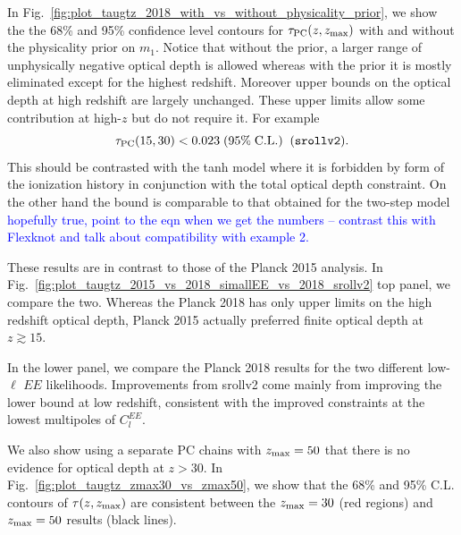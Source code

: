 \documentclass[prd,twocolumn,amsmath,amssymb,floatfix,superscriptaddress,nofootinbib]{revtex4-1}
\newcommand{\zmax}{z_{\rm max}}
\newcommand{\beq}{\begin{equation}}
\newcommand{\eeq}{\end{equation}}
\newcommand{\wh}[1]{\textcolor{blue}{#1}}
\begin{document}
{In Fig.~\ref{fig:plot_taugtz_2018_with_vs_without_physicality_prior}, we show the 
the 68\% and 95\% confidence level contours for  $\tau_{\rm PC}(z,z_{\rm max})$ with and without the physicality prior on $m_1$.  Notice that without the prior, a larger range of unphysically negative optical depth is allowed whereas with the prior it is mostly eliminated except for the highest redshift.  Moreover upper bounds on the optical depth at high 
redshift are largely unchanged.   These upper limits allow some contribution at high-$z$ but do not require it.   For example
\beq
\tau_{\rm PC}(15, 30) < 0.023 \; (95\%\; \mathrm{C.L.})\;\;(\texttt{srollv2}).
\eeq
This should be contrasted with the tanh model 
 where it is  forbidden by form of the ionization history in conjunction with the total optical depth constraint.  
 On the other hand the bound is comparable to that obtained for the two-step model 
 \wh{hopefully true, point to the eqn when we get the numbers -- contrast this with Flexknot and talk about compatibility with example 2.}
 
These results are in contrast to those of the Planck 2015 analysis. 
In Fig.~\ref{fig:plot_taugtz_2015_vs_2018_simallEE_vs_2018_srollv2} top panel, we compare
the two.  Whereas the Planck 2018 has only upper limits on the high redshift optical depth, Planck 2015 actually preferred
finite optical depth at $z\gtrsim 15$.

In the lower panel, we compare the Planck 2018 results for the two different low-$\ell$ $EE$ likelihoods.  Improvements from srollv2 come mainly from improving the lower bound at low redshift, consistent with the improved constraints at the lowest multipoles of $C_l^{EE}$.

We also show using a separate PC chains with $\zmax = 50$ that there is no evidence for optical depth at $z>30$. 
In Fig.~\ref{fig:plot_taugtz_zmax30_vs_zmax50}, we show that the 68\% and 95\% C.L. contours of $\tau(z, \zmax)$ are consistent between the $\zmax = 30$ (red regions) and $\zmax = 50$ results (black lines).

%
%

}
\end{document}
